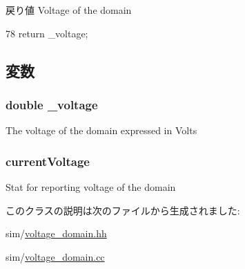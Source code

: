 \begin{DoxyReturn}{戻り値}
Voltage of the domain 
\end{DoxyReturn}



\begin{DoxyCode}
78 { return _voltage; }
\end{DoxyCode}


\subsection{変数}
\hypertarget{classVoltageDomain_aaf1af884796c01ac02f71c1b244decba}{
\subsubsection[{\_\-voltage}]{\setlength{\rightskip}{0pt plus 5cm}double {\bf \_\-voltage}}}
\label{classVoltageDomain_aaf1af884796c01ac02f71c1b244decba}
The voltage of the domain expressed in Volts \hypertarget{classVoltageDomain_abc6914945babebfaf2e020db90006e28}{
\subsubsection[{currentVoltage}]{ {\bf currentVoltage}}}
\label{classVoltageDomain_abc6914945babebfaf2e020db90006e28}
Stat for reporting voltage of the domain 

このクラスの説明は次のファイルから生成されました:\begin{DoxyCompactItemize}
\item 
sim/\hyperlink{voltage__domain_8hh}{voltage\_\-domain.hh}\item 
sim/\hyperlink{voltage__domain_8cc}{voltage\_\-domain.cc}\end{DoxyCompactItemize}
